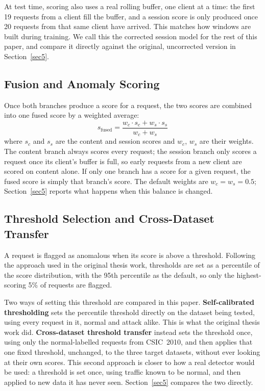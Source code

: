 \documentclass[futureinternet,article,accept,moreauthors]{Definitions/mdpi}
\begin{document}
At test time, scoring also uses a real rolling buffer, one client at a time: the first 19 requests from a client fill the buffer, and a session score is only produced once 20 requests from that same client have arrived. This matches how windows are built during training. We call this the corrected session model for the rest of this paper, and compare it directly against the original, uncorrected version in Section~\ref{sec5}.

\subsection{Fusion and Anomaly Scoring}

Once both branches produce a score for a request, the two scores are combined into one fused score by a weighted average:
\begin{equation}
s_{\text{fused}} = \frac{w_c \cdot s_c + w_s \cdot s_s}{w_c + w_s}
\end{equation}
where $s_c$ and $s_s$ are the content and session scores and $w_c$, $w_s$ are their weights. The content branch always scores every request; the session branch only scores a request once its client's buffer is full, so early requests from a new client are scored on content alone. If only one branch has a score for a given request, the fused score is simply that branch's score. The default weights are $w_c = w_s = 0.5$; Section~\ref{sec5} reports what happens when this balance is changed.

\subsection{Threshold Selection and Cross-Dataset Transfer} \label{sec4.7}

A request is flagged as anomalous when its score is above a threshold. Following the approach used in the original thesis work, thresholds are set as a percentile of the score distribution, with the 95th percentile as the default, so only the highest-scoring 5\% of requests are flagged.

Two ways of setting this threshold are compared in this paper. \textbf{Self-calibrated thresholding} sets the percentile threshold directly on the dataset being tested, using every request in it, normal and attack alike. This is what the original thesis work did. \textbf{Cross-dataset threshold transfer} instead sets the threshold once, using only the normal-labelled requests from CSIC~2010, and then applies that one fixed threshold, unchanged, to the three target datasets, without ever looking at their own scores. This second approach is closer to how a real detector would be used: a threshold is set once, using traffic known to be normal, and then applied to new data it has never seen. Section~\ref{sec5} compares the two directly.
\end{document}
